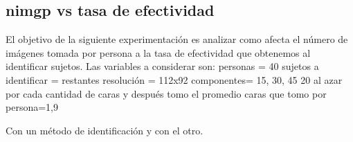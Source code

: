 \subsection{nimgp vs tasa de efectividad}
El objetivo de la siguiente experimentación es analizar como afecta el n\'umero de imágenes tomada por persona a la tasa de efectividad
que obtenemos al identificar sujetos. Las variables a considerar son: 
personas = 40
sujetos a identificar = restantes
resolución = 112x92
componentes= 15, 30, 45
20 al azar por cada cantidad de caras y después tomo el promedio
caras que tomo por persona=1,9

Con un método de identificación y con el otro.